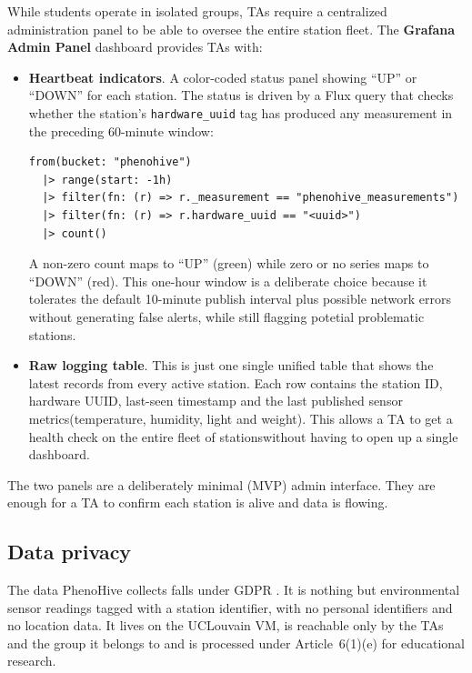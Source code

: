 While students operate in isolated groups, TAs require a centralized administration panel to be able to oversee the entire station fleet. The \textbf{Grafana Admin Panel} dashboard provides TAs with:
\begin{itemize}
    \item \textbf{Heartbeat indicators}. A color-coded status panel showing ``UP'' or ``DOWN'' for each station. The status is driven by a Flux query that checks whether the station's \texttt{hardware\_uuid} tag has produced any measurement in the preceding 60-minute window:
\begin{verbatim}
from(bucket: "phenohive")
  |> range(start: -1h)
  |> filter(fn: (r) => r._measurement == "phenohive_measurements")
  |> filter(fn: (r) => r.hardware_uuid == "<uuid>")
  |> count()
\end{verbatim}
    A non-zero count maps to ``UP'' (green) while zero or no series maps to ``DOWN'' (red). This one-hour window is a deliberate choice because it tolerates the default 10-minute publish interval plus possible network errors without generating false alerts, while still flagging potetial problematic stations.
    \item \textbf{Raw logging table}. This is just one single unified table that shows the latest records from every active station. Each row contains the station ID, hardware UUID, last-seen timestamp and the last published sensor metrics(temperature, humidity, light and weight). This allows a TA to get a health check on the entire fleet of stationswithout having to open up a single dashboard.
\end{itemize}

The two panels are a deliberately minimal (MVP) admin interface. They are enough for a TA to confirm each station is alive and data is flowing.


\subsection{Data privacy}

The data PhenoHive collects falls under GDPR \parencite{gdprArt6}. It is nothing but environmental sensor readings tagged with a station identifier, with no personal identifiers and no location data. It lives on the UCLouvain VM, is reachable only by the TAs and the group it belongs to and is processed under Article~6(1)(e) for educational research.

